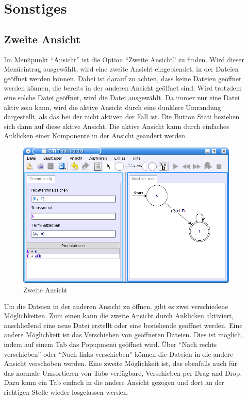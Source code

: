 

\chapter{Sonstiges}


\section{Zweite Ansicht}

Im Menüpunkt "`Ansicht"' ist die Option "`Zweite Ansicht"' zu finden. Wird dieser
Menüeintrag ausgewählt, wird eine zweite Ansicht eingeblendet, in der Dateien
geöffnet werden können. Dabei ist darauf zu achten, dass keine Dateien geöffnet
werden können, die bereits in der anderen Ansicht geöffnet sind. Wird trotzdem
eine solche Datei geöffnet, wird die Datei ausgewählt. Da immer nur eine Datei
aktiv sein kann, wird die aktive Ansicht durch eine dunklere Umrandung
dargestellt, als das bei der nicht aktiven der Fall ist. Die Button Stati
beziehen sich dann auf diese aktive Ansicht. Die aktive Ansicht kann durch
einfaches Anklicken einer Komponente in der Ansicht geändert werden.\vspace{10pt}

\begin{figure}[h]
\begin{center}
\includegraphics[width=12cm]{../images/second_view.png}
\caption{Zweite Ansicht}
\end{center}
\end{figure}

Um die Dateien in der anderen Ansicht zu öffnen, gibt es zwei verschiedene
Möglichkeiten. Zum einen kann die zweite Ansicht durch Anklicken aktiviert,
anschließend eine neue Datei erstellt oder eine bestehende geöffnet werden.
Eine andere Möglichkeit ist das Verschieben von geöffneten Dateien. Dies ist
möglich, indem auf einem Tab das Popupmenü geöffnet wird. Über "`Nach rechts
verschieben"' oder "`Nach links verschieben"' können die Dateien in die andere
Ansicht verschoben werden. Eine zweite Möglichkeit ist, das ebenfalls auch für
das normale Umsortieren von Tabs verfügbare, Verschieben per Drag and Drop.
Dazu kann ein Tab einfach in die andere Ansicht gezogen und dort an der richtigen
Stelle wieder losgelassen werden.\vspace{10pt}

